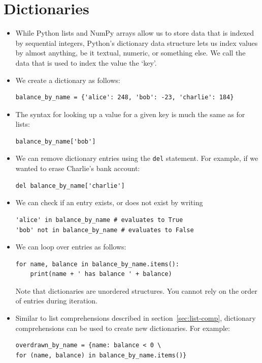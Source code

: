 \documentclass[a4paper,twoside,titlepage]{memoir}
\newcommand{\shellcmd}{\texttt}
\begin{document}
\section{Dictionaries}
\begin{itemize}
\item While Python lists and NumPy arrays allow us to store data that is indexed by sequential integers, Python's dictionary data structure lets us index values by almost anything, be it textual, numeric, or something else.  We call the data that is used to index the value the `key'.
\item We create a dictionary as follows:
\begin{verbatim}
balance_by_name = {'alice': 248, 'bob': -23, 'charlie': 184}
\end{verbatim}

\item The syntax for looking up a value for a given key is much the same as for lists:
\begin{verbatim}
balance_by_name['bob']
\end{verbatim}

\item We can remove dictionary entries using the \shellcmd{del} statement.  For example, if we wanted to erase Charlie's bank account:
\index{del@\shellcmd{del}}
\begin{verbatim}
del balance_by_name['charlie']
\end{verbatim}

\item We can check if an entry exists, or does not exist by writing
\begin{verbatim}
'alice' in balance_by_name # evaluates to True
'bob' not in balance_by_name # evaluates to False
\end{verbatim}

\item We can loop over entries as follows:
\begin{verbatim}
for name, balance in balance_by_name.items():
	print(name + ' has balance ' + balance)
\end{verbatim}
Note that dictionaries are unordered structures.  You cannot rely on the order of entries during iteration.

\item Similar to list comprehensions described in section~\ref{sec:list-comp}, dictionary comprehensions can be used to create new dictionaries.  For example:
\begin{verbatim}
overdrawn_by_name = {name: balance < 0 \
for (name, balance) in balance_by_name.items()}
\end{verbatim}
\end{itemize}

\backmatter
\printindex
\end{document}
